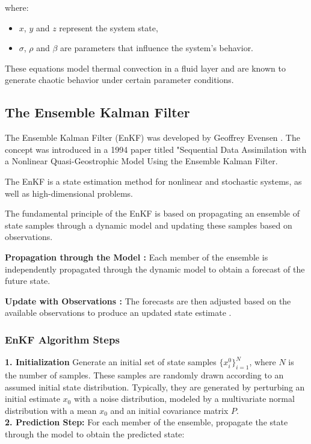 \documentclass[a4paper,12pt,french]{article}
\begin{document}
where:
\begin{itemize}
    \item $x$, $y$ and $z$ represent the system state,
    \item $\sigma$, $\rho$ and $\beta$ are parameters that influence the system's behavior.
\end{itemize}

These equations model thermal convection in a fluid layer and are known 
to generate chaotic behavior under certain parameter conditions.

\subsection{The Ensemble Kalman Filter}
The Ensemble Kalman Filter (EnKF) was developed by Geoffrey Evensen \cite{iglesias2013ensemble}. 
The concept was introduced in a 1994 paper titled "Sequential Data Assimilation with a Nonlinear Quasi-Geostrophic Model Using the Ensemble Kalman Filter.

The EnKF is a state estimation method for nonlinear and stochastic systems, as well as high-dimensional problems.

The fundamental principle of the EnKF is based on propagating an ensemble of state samples through a dynamic model and updating these samples based on observations.

\textbf{Propagation through the Model :}
Each member of the ensemble is independently propagated through the dynamic model to obtain a forecast of the future state.

\textbf{Update with Observations :}
The forecasts are then adjusted based on the available observations to produce an updated state estimate \cite{wikipediaEnKF}.

\subsubsection{EnKF Algorithm Steps} 
\textbf{1. Initialization}
   Generate an initial set of state samples $\{x_i^0 \}_{i=1}^N$, where $N$ is the number of samples. These samples are randomly drawn according to an assumed initial state distribution. Typically, they are generated by perturbing an initial estimate $x_0$ with a noise distribution, modeled by a multivariate normal distribution with a mean $x_0$ and an initial covariance matrix $P$.\\
\textbf{2. Prediction Step:}
   For each member of the ensemble, propagate the state through the model to obtain the predicted state:
\end{document}
